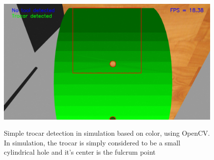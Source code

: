 \begin{center}
\begin{figure}[H]
\centering
\includegraphics[width=12cm]{images/opencv-trocar-detection.png}\\
\caption{Simple trocar detection in simulation based on color, using OpenCV. In simulation, the trocar is simply considered to be a small 
cylindrical hole and it's center is the fulcrum point}
\end{figure}
\end{center}
